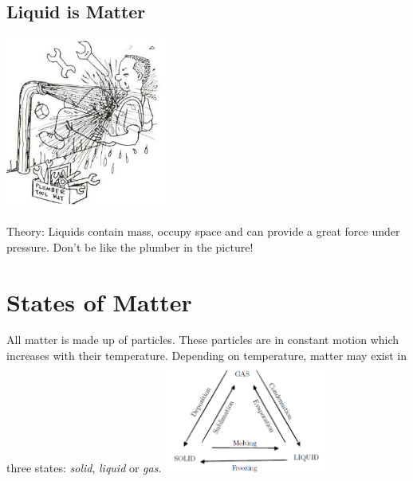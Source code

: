 \begin{multicols}{2}
\subsection{Liquid is Matter}

\begin{center}
\includegraphics[width=0.4\textwidth]{./img/source/liquid-matter.jpg}
\end{center}

\begin{description*}
\item[Theory:]{Liquids contain mass, occupy space and can provide a great force under pressure. Don't be like the plumber in the picture!}
\end{description*}


\section*{States of Matter}
All matter is made up of particles. These particles are in constant motion which increases with their temperature. Depending on temperature, matter may exist in three states: \emph{solid}, \emph{liquid} or \emph{gas}.
\includegraphics[width=0.4\textwidth]{./img/changes-of-state.png}


\end{multicols}
